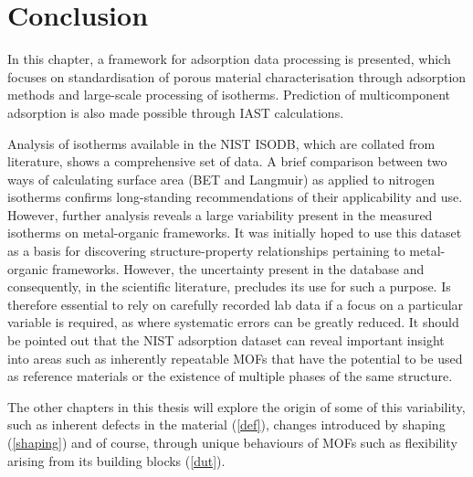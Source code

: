 
\section{Conclusion}

In this chapter, a framework for adsorption data processing is
presented, which focuses on standardisation of porous material
characterisation through adsorption methods and large-scale
processing of isotherms. Prediction of multicomponent
adsorption is also made possible through IAST calculations.

Analysis of isotherms available in the NIST ISODB, which are collated
from literature, shows a comprehensive set of data. A brief comparison
between two ways of calculating surface area (BET and Langmuir) as applied
to nitrogen isotherms confirms long-standing recommendations of their
applicability and use. However, further analysis reveals a large
variability present in the measured isotherms on metal-organic
frameworks. It was initially hoped to use this dataset as a basis
for discovering structure-property relationships pertaining to 
metal-organic frameworks. However, the uncertainty present in the database
and consequently, in the scientific literature, precludes its 
use for such a purpose. Is therefore essential to rely on carefully
recorded lab data if a focus on a particular variable is required,
as where systematic errors can be greatly reduced.
It should be pointed out that the NIST adsorption dataset can reveal
important insight into areas such as inherently repeatable
MOFs that have the potential to be used as reference materials or the
existence of multiple phases of the same structure.

The other chapters in this thesis will explore the origin of some of
this variability, such as inherent defects in the material (\autoref{def}),
changes introduced by shaping (\autoref{shaping}) and of course, through
unique behaviours of MOFs such as flexibility arising from its building
blocks (\autoref{dut}).

\FloatBarrier%
\pagebreak